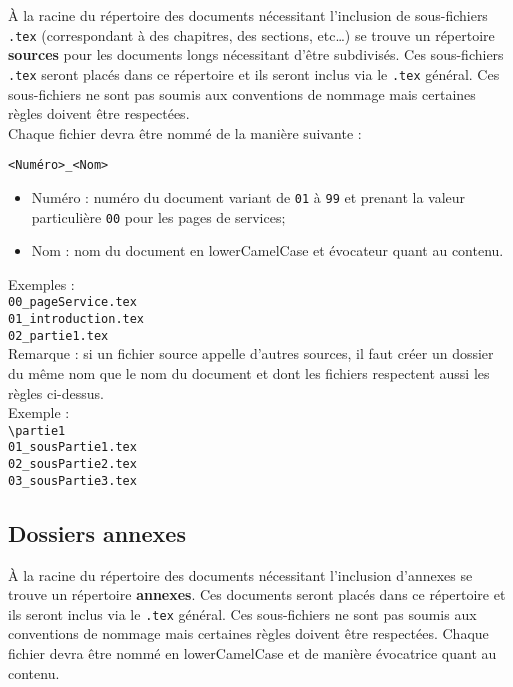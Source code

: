 \`{A} la racine du répertoire des documents nécessitant l'inclusion de sous-fichiers \verb+.tex+
(correspondant à des chapitres, des sections, etc\dots) se trouve un répertoire \textbf{sources} pour
les documents longs nécessitant d'être subdivisés. 
Ces sous-fichiers \verb+.tex+ seront placés dans ce répertoire et ils seront inclus via
le \verb+.tex+ général. Ces sous-fichiers ne sont pas soumis aux conventions de nommage mais certaines règles doivent être respectées.\\
Chaque fichier devra être nommé de la manière suivante :
\begin{center}
\verb+<Numéro>_<Nom>+
\end{center}
\begin{itemize} 
\item Numéro : numéro du document variant de \verb+01+ à \verb+99+ et prenant la valeur particulière \verb+00+ pour les pages de services;
\item Nom : nom du document en lowerCamelCase et évocateur quant au contenu.\\
\end{itemize}
Exemples : \\
\verb+00_pageService.tex+\\
\verb+01_introduction.tex+\\
\verb+02_partie1.tex+\\

Remarque : si un fichier source appelle d'autres sources, il faut créer un dossier du même nom que le nom du document et dont les fichiers respectent aussi les règles ci-dessus.\\
Exemple : \\
\verb+\partie1+\\
\hspace*{1cm} \verb+01_sousPartie1.tex+\\
\hspace*{1cm} \verb+02_sousPartie2.tex+\\
\hspace*{1cm} \verb+03_sousPartie3.tex+\\

\subsection{Dossiers annexes}

\`{A} la racine du répertoire des documents nécessitant l'inclusion d'annexes se trouve un répertoire \textbf{annexes}.
Ces documents seront placés dans ce répertoire et ils seront inclus via
le \verb+.tex+ général. Ces sous-fichiers ne sont pas soumis aux conventions de nommage mais certaines règles doivent être respectées. Chaque fichier devra être nommé en lowerCamelCase et de manière évocatrice quant au contenu. 

